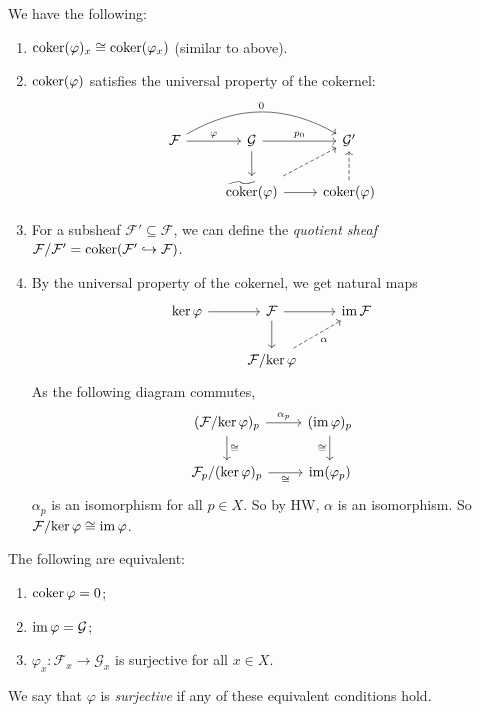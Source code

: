 \begin{remark}
  We have the following:
  \begin{enumerate}
    \item $\operatorname{coker}(\varphi)_x \cong \operatorname{coker}(\varphi_x)$
      (similar to above).
    \item $\operatorname{coker}(\varphi)$
      satisfies the universal
      property of the cokernel:
      \[
        \begin{tikzcd}
          \mathcal{F} \ar[r, "\varphi"] \ar[rr, "0", bend left=30]
          & \mathcal{G} \ar[r, "p_0"] \ar[d]
          & \mathcal{G}' \\
          & \widetilde{\coker}(\varphi)
          \ar[r] \ar[ur, dashed] & \coker(\varphi) \ar[u, dashed]
        \end{tikzcd}
      \]
    \item For a subsheaf
      $\mathcal{F}' \subseteq \mathcal{F}$,
      we can define the \emph{quotient sheaf}
      $\mathcal{F}/\mathcal{F}' = \operatorname{coker}(\mathcal{F'} \hookrightarrow \mathcal{F})$.
    \item By the universal property
      of the cokernel, we get natural
      maps
      \[
        \begin{tikzcd}
          \ker \varphi \ar[r] & \mathcal{F} \ar[r] \ar[d] & \im \mathcal{F} \\
          & \mathcal{F} / {\ker \varphi} \ar[ur, dashed, "\alpha", swap]
        \end{tikzcd}
      \]
      As the following diagram commutes,
      \[
        \begin{tikzcd}
          (\mathcal{F} / {\ker \varphi})_p \ar[r, "\alpha_p"] \ar[d, "\cong"] & (\im \varphi)_p \ar[d, "\cong", swap] \\
          \mathcal{F}_p / {(\ker \varphi)_p} \ar[r, "\cong", swap] & \im(\varphi_p)
        \end{tikzcd}
      \]
      $\alpha_p$
      is an isomorphism for all
      $p \in X$. So by HW,
      $\alpha$ is an isomorphism.
      So $\mathcal{F} / {\ker \varphi} \cong \operatorname{im} \varphi$.
  \end{enumerate}
\end{remark}

\begin{lemma}
  The following are equivalent:
  \begin{enumerate}
    \item $\operatorname{coker} \varphi = 0$;
    \item $\operatorname{im} \varphi = \mathcal{G}$;
    \item $\varphi_x : \mathcal{F}_x \to \mathcal{G}_x$
      is surjective for all $x \in X$.
  \end{enumerate}
  We say that $\varphi$ is
  \emph{surjective} if any of these
  equivalent conditions hold.
\end{lemma}

